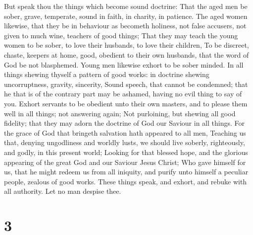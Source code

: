  But speak thou the things which become sound doctrine:
 That the aged men be sober, grave, temperate, sound in
faith, in charity, in patience.  The aged women likewise,
that they be in behaviour as becometh holiness, not false accusers, not
given to much wine, teachers of good things;  That they
may teach the young women to be sober, to love their husbands, to love
their children,  To be discreet, chaste, keepers at home,
good, obedient to their own husbands, that the word of God be not
blasphemed.  Young men likewise exhort to be sober minded.
 In all things shewing thyself a pattern of good works: in
doctrine shewing uncorruptness, gravity, sincerity,  Sound
speech, that cannot be condemned; that he that is of the contrary part
may be ashamed, having no evil thing to say of you. 
Exhort servants to be obedient unto their own masters, and to please
them well in all things; not answering again;  Not
purloining, but shewing all good fidelity; that they may adorn the
doctrine of God our Saviour in all things.  For the grace
of God that bringeth salvation hath appeared to all men, 
Teaching us that, denying ungodliness and worldly lusts, we should live
soberly, righteously, and godly, in this present world; 
Looking for that blessed hope, and the glorious appearing of the great
God and our Saviour Jesus Christ;  Who gave himself for
us, that he might redeem us from all iniquity, and purify unto himself a
peculiar people, zealous of good works.  These things
speak, and exhort, and rebuke with all authority. Let no man despise
thee.

\hypertarget{section-2}{%
\section{3}\label{section-2}}

